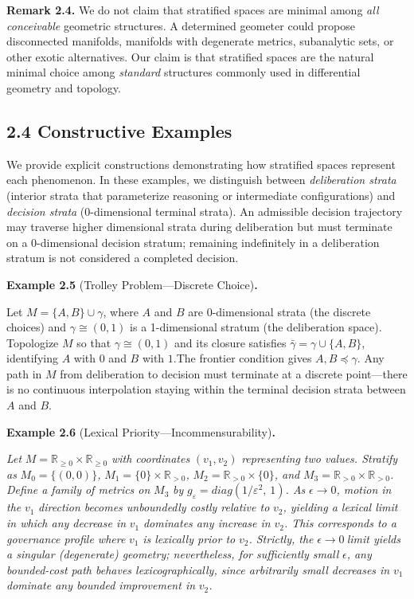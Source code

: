 \documentclass[12pt]{article}
\theoremstyle{plain}
\theoremstyle{definition}
\theoremstyle{remark}
\begin{document}
\textbf{Remark 2.4.} We do not claim that stratified spaces are minimal
among \emph{all conceivable} geometric structures. A determined geometer
could propose disconnected manifolds, manifolds with degenerate metrics,
subanalytic sets, or other exotic alternatives. Our claim is that
stratified spaces are the natural minimal choice among \emph{standard}
structures commonly used in differential geometry and topology.

\subsection{2.4 Constructive Examples}\label{constructive-examples}

We provide explicit constructions demonstrating how stratified spaces
represent each phenomenon. In these examples, we distinguish between
\emph{deliberation strata} (interior strata that parameterize reasoning
or intermediate configurations) and \emph{decision strata}
(0-dimensional terminal strata). An admissible decision trajectory may
traverse higher dimensional strata during deliberation but must
terminate on a 0-dimensional decision stratum; remaining indefinitely in
a deliberation stratum is not considered a completed decision.

\textbf{Example 2.5} (Trolley Problem---Discrete Choice)\textbf{.}

Let \(M = \{ A,B\} \cup \gamma\), where \(A\) and \(B\) are
0-dimensional strata (the discrete choices) and \(\gamma \cong (0,1)\)
is a 1-dimensional stratum (the deliberation space). Topologize \(M\) so
that \(\gamma \cong (0,1)\) and its closure satisfies
\(\bar{\gamma} = \gamma \cup \{ A,B\}\), identifying \(A\) with \(0\)
and \(B\) with \(1\).The frontier condition gives
\(A,B \preceq \gamma\). Any path in \(M\) from deliberation to decision
must terminate at a discrete point---there is no continuous
interpolation staying within the terminal decision strata between \(A\)
and \(B\).

\textbf{Example 2.6} (Lexical Priority---Incommensurability)\textbf{.}

\emph{Let} \(M = \mathbb{R}_{\geq 0} \times \mathbb{R}_{\geq 0}\)
\emph{with coordinates} \(\left( v_{1},v_{2} \right)\)
\emph{representing two values. Stratify as}
\(M_{0} = \{(0,0)\}\)\emph{,}
\(M_{1} = \{ 0\} \times \mathbb{R}_{> 0}\)\emph{,}
\(M_{2} = \mathbb{R}_{> 0} \times \{ 0\}\)\emph{, and}
\(M_{3} = \mathbb{R}_{> 0} \times \mathbb{R}_{> 0}\)\emph{. Define a
family of metrics on} \(M_{3}\) \emph{by}
\(g_{\varepsilon} = diag(1/\varepsilon^{2},\text{ }1)\)\emph{. As}
\(\epsilon \rightarrow 0\)\emph{, motion in the} \(v_{1}\)
\emph{direction becomes unboundedly costly relative to} \(v_{2}\)\emph{,
yielding a lexical limit in which any decrease in} \(v_{1}\)
\emph{dominates any increase in} \(v_{2}\)\emph{. This corresponds to a
governance profile where} \(v_{1}\) \emph{is lexically prior to}
\(v_{2}\)\emph{. Strictly, the} \(\epsilon \rightarrow 0\ \)\emph{limit
yields a singular (degenerate) geometry; nevertheless, for sufficiently
small} \(\epsilon\)\emph{, any bounded-cost path behaves
lexicographically, since arbitrarily small decreases in} \(v_{1}\)
\emph{dominate any bounded improvement in} \(v_{2}\)\emph{.}
\end{document}

